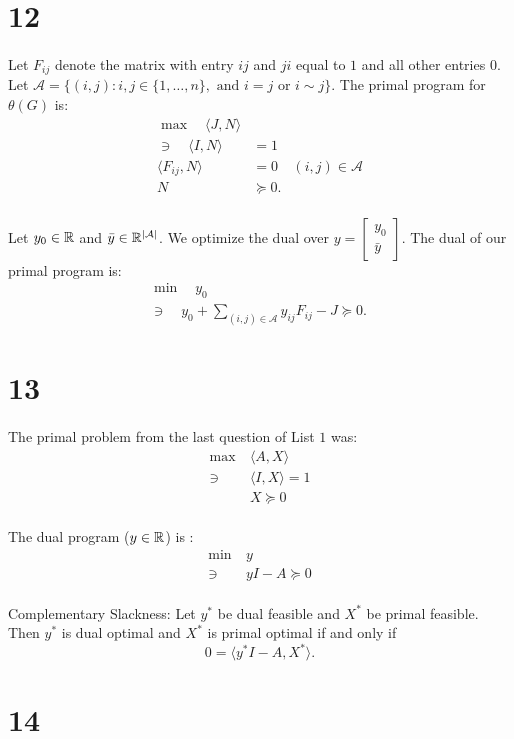 \documentclass[letterpaper,12pt,oneside,onecolumn]{article}
\newcommand{\1}{\mathbbm{1}}
\newcommand{\cA}{\mathcal{A}} \newcommand{\cB}{\mathcal{B}}
\begin{document}
\section*{12}
\paragraph{}
Let $F_{ij}$ denote the matrix with entry $ij$ and $ji$ equal to $1$ and all other entries $0$. Let $\cA = \{ (i,j) : i,j \in \{1, \dots, n\}, \text{ and $i=j$ or $i\sim j$}\}$. The primal program for $\theta(G)$ is:
\begin{align*}
\max\quad \langle J, N \rangle&\ \\
\ni\quad \langle I, N \rangle &= 1 \\
\langle F_{ij}, N \rangle &= 0 &\text{$(i,j) \in \cA$}\\
N &\succcurlyeq 0.
\end{align*}
\paragraph{} 
Let $y_0 \in \mathbb{R}$ and $\bar{y} \in \R^{|\cA|}$. We optimize the dual over $y = \begin{bmatrix} y_0 \\ \bar{y} \end{bmatrix}$. The dual of our primal program is:
\begin{align*}
&\min\quad y_0&\ \\
&\ni\quad  y_0+ \sum_{(i,j) \in \cA} y_{ij}F_{ij} - J \succcurlyeq 0.
\end{align*}
\section*{13}
\paragraph{}
The primal problem from the last question of List $1$ was:
\begin{align*}
\max\ &\langle A, X \rangle \\
\ni\ &\langle I, X\rangle = 1\\
&X \succcurlyeq 0
\end{align*}
\paragraph{}
The dual program ($y \in \mathbb{R}$) is :
\begin{align*}
\min\ &y \\
\ni\ &yI - A \succcurlyeq 0
\end{align*}
\paragraph{}
Complementary Slackness: Let $y^*$ be dual feasible and $X^*$ be primal feasible. Then $y^*$ is dual optimal and $X^*$ is primal optimal if and only if
$$ 0 = \langle y^*I - A,X^*\rangle.$$
\section*{14}
\paragraph{}
\end{document}
